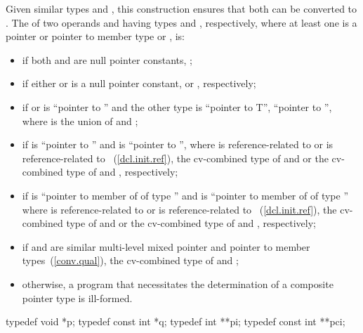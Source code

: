 \enternote Given similar types  and , this
construction ensures that
both can be converted to . \exitnote
The  of
two operands  and
 having types  and , respectively, where at least one is a
pointer or pointer to member type or
, is:

\begin{itemize}
\item
if both  and  are null pointer constants,
;

\item
if either  or  is a null pointer constant,  or ,
respectively;

\item
if  or  is ``pointer to  '' and the
other type is ``pointer to  T'', ``pointer to 
'', where  is the union of 
and ;

\item
if  is ``pointer to  '' and  is ``pointer to
 '', where  is reference-related to  or  is
reference-related to ~(\ref{dcl.init.ref}), the cv-combined type
of  and  or the cv-combined type of  and ,
respectively;

\item
if  is ``pointer to member of  of type  '' and  is
``pointer to member of  of type  '' where  is
reference-related to  or  is reference-related to
~(\ref{dcl.init.ref}), the cv-combined type of  and  or the cv-combined type
of  and , respectively;

\item
if  and  are similar multi-level mixed pointer and pointer to
member types~(\ref{conv.qual}), the cv-combined type of  and
;

\item
otherwise, a program that necessitates the determination of a
composite pointer type is ill-formed.
\end{itemize}

\enterexample
\begin{codeblock}
typedef void *p;
typedef const int *q;
typedef int **pi;
typedef const int **pci;
\end{codeblock}

